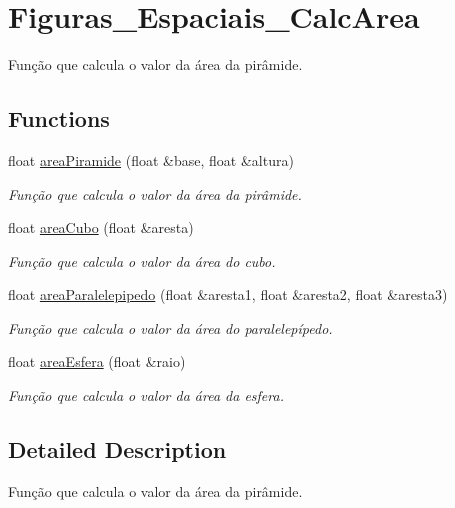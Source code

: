 \hypertarget{group__Figuras__Espaciais__CalcArea}{}\section{Figuras\+\_\+\+Espaciais\+\_\+\+Calc\+Area}
\label{group__Figuras__Espaciais__CalcArea}


Função que calcula o valor da área da pirâmide.  


\subsection*{Functions}
\begin{DoxyCompactItemize}
\item 
float \hyperlink{group__Figuras__Espaciais__CalcArea_ga10226ad45447d70353626a01897d1b06}{area\+Piramide} (float \&base, float \&altura)
\begin{DoxyCompactList}\small\item\em Função que calcula o valor da área da pirâmide. \end{DoxyCompactList}\item 
float \hyperlink{group__Figuras__Espaciais__CalcArea_gab519a0d997044a93085abaaaf6270ab5}{area\+Cubo} (float \&aresta)
\begin{DoxyCompactList}\small\item\em Função que calcula o valor da área do cubo. \end{DoxyCompactList}\item 
float \hyperlink{group__Figuras__Espaciais__CalcArea_gaff7dfecfa742b07c8e8e243325d95117}{area\+Paralelepipedo} (float \&aresta1, float \&aresta2, float \&aresta3)
\begin{DoxyCompactList}\small\item\em Função que calcula o valor da área do paralelepípedo. \end{DoxyCompactList}\item 
float \hyperlink{group__Figuras__Espaciais__CalcArea_ga2d0b18f7e5391dd6a8bff93bb679171a}{area\+Esfera} (float \&raio)
\begin{DoxyCompactList}\small\item\em Função que calcula o valor da área da esfera. \end{DoxyCompactList}\end{DoxyCompactItemize}


\subsection{Detailed Description}
Função que calcula o valor da área da pirâmide. 


